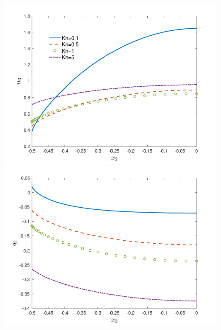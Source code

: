 \begin{figure}[t]
	\centering
	{\includegraphics[scale=0.4]{LinearizedBol/IMG/Poiseuille_1D_HS.pdf}} 	{\includegraphics[scale=0.4]{LinearizedBol/IMG/Poiseuille_1D_HS2.pdf}}\\

\end{figure}
